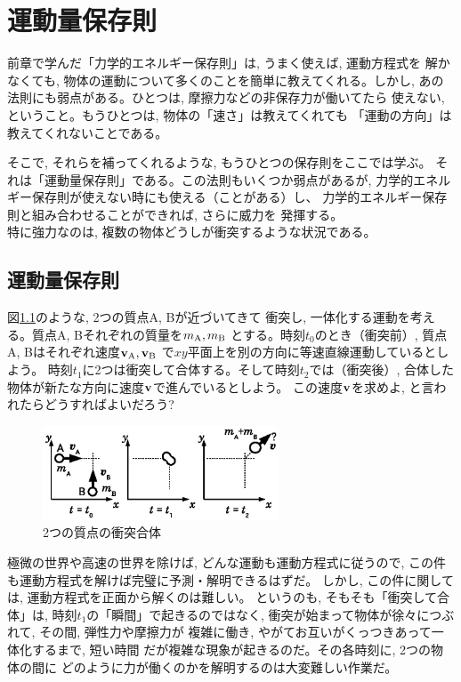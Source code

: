 \chapter{運動量保存則}

前章で学んだ「力学的エネルギー保存則」は, うまく使えば, 運動方程式を
解かなくても, 物体の運動について多くのことを簡単に教えてくれる。しかし, 
あの法則にも弱点がある。ひとつは, 摩擦力などの非保存力が働いてたら
使えない, ということ。もうひとつは, 物体の「速さ」は教えてくれても
「運動の方向」は教えてくれないことである。

そこで, それらを補ってくれるような, もうひとつの保存則をここでは学ぶ。
それは「運動量保存則」である。この法則もいくつか弱点があるが, 
力学的エネルギー保存則が使えない時にも使える（ことがある）し、
力学的エネルギー保存則と組み合わせることができれば, さらに威力を
発揮する。\\

特に強力なのは, 複数の物体どうしが衝突するような状況である。\\

\section{運動量保存則}

図\ref{fig:collision}のような, 2つの質点A, Bが近づいてきて
衝突し, 一体化する運動を考える。質点A, Bそれぞれの質量を$m_{\text A}, m_{\text B}$
とする。時刻$t_0$のとき（衝突前）, 質点A, Bはそれぞれ速度${\bf v}_{\text A}, {\bf v}_{\text B}$
で$xy$平面上を別の方向に等速直線運動しているとしよう。
時刻$t_1$に2つは衝突して合体する。そして時刻$t_2$では（衝突後）, 
合体した物体が新たな方向に速度${\bf v}$で進んでいるとしよう。
この速度${\bf v}$を求めよ, と言われたらどうすればよいだろう?

\begin{figure}[h]
    \centering
    \includegraphics[width=7.0cm]{collision.eps}
    \caption{2つの質点の衝突合体}\label{fig:collision}
\end{figure}

極微の世界や高速の世界を除けば, どんな運動も運動方程式に従うので, 
この件も運動方程式を解けば完璧に予測・解明できるはずだ。
しかし, この件に関しては, 運動方程式を正面から解くのは難しい。
というのも, そもそも「衝突して合体」は, 時刻$t_1$の「瞬間」で起きるのではなく, 
衝突が始まって物体が徐々につぶれて, その間, 弾性力や摩擦力が
複雑に働き, やがてお互いがくっつきあって一体化するまで, 短い時間
だが複雑な現象が起きるのだ。その各時刻に, 2つの物体の間に
どのように力が働くのかを解明するのは大変難しい作業だ。

